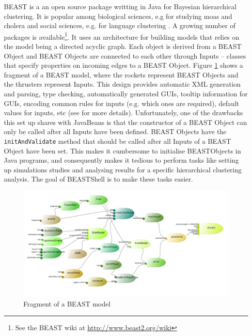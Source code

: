 \documentclass[twoside,11pt]{article}
\begin{document}
BEAST \citep{beast2} is a an open source package writting in Java for Bayesian hierarchical 
clustering. It is popular among biological sciences, e.g for studying moas \citep{bunce2003extreme}
and cholera \citep{mutreja2011evidence} and social sciences, e.g. for language clustering \citep{bouckaert2012mapping,gray2009language}.
A growing number of packages is available\footnote{See the BEAST wiki at
\url{http://www.beast2.org/wiki}}. It uses an architecture for building models that 
relies on the model being a directed acyclic graph. Each object is derived from a BEAST 
Object and BEAST Objects are connected to each other through Inputs -- classes that 
specify properties on incoming edges to a BEAST Object. Figure \ref{fig.model} shows
a fragment of a BEAST model, where the rockets represent BEAST Objects and the thrusters
represent Inputs. This design provides automatic XML generation and parsing, type checking, 
automatically generated GUIs, tooltip information for GUIs, encoding common
rules for inputs (e.g. which ones are required), default values for inputs, etc (see
\cite{beastbook} for more details). Unfortunately, one of the drawbacks this set up
shares with JavaBeans is that the constructor of a BEAST Object can only be called after
all Inputs have been defined. BEAST Objects have the {\tt initAndValidate} method that should be 
called after all Inputs of a BEAST Object have been set. This makes it cumbersome to
initialise BEASTObjects in Java programs, and consequently makes it tedious to perform
tasks like setting up simulations studies and analysing results for a specific hierarchical
clustering analysis. The goal of BEASTShell is to make these tasks easier.

\begin{figure}
\begin{center}
\includegraphics[width=0.8
\textwidth]{model}
\end{center}
\caption{\label{fig.model}Fragment of a BEAST model}
\end{figure}
\end{document}
